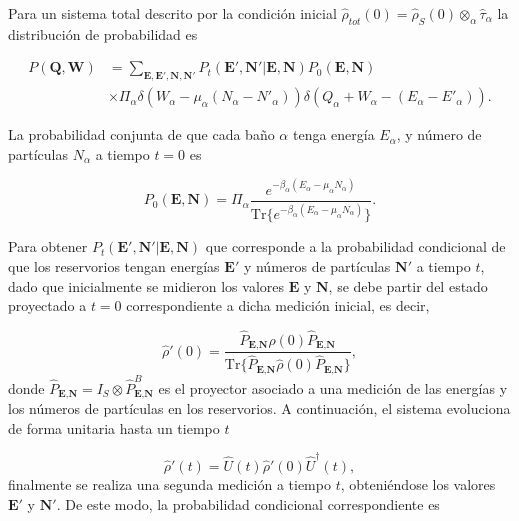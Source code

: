 Para  un sistema total descrito por la condición inicial $\hat{\rho}_{tot}(0) = \hat{\rho}_{S}(0) \otimes_{\alpha} \hat{\tau}_{\alpha}$ la distribución de probabilidad es   

\begin{align*}
    P(\textbf{Q},\textbf{W}) & = \sum_{\textbf{E},\textbf{E}',\textbf{N},\textbf{N}'} P_{t}(\textbf{E}',\textbf{N}'|\textbf{E},\textbf{N}) P_{0}(\textbf{E},\textbf{N})\\
                             & \times \Pi_{\alpha} \delta(W_{\alpha} - \mu_{\alpha}(N_{\alpha} - N'_{\alpha})) \delta(Q_{\alpha} + W_{\alpha}  - (E_{\alpha} - E'_{\alpha})).   
\end{align*}

La probabilidad conjunta de que cada baño $\alpha$ tenga energía $E_{\alpha}$, y número de partículas $N_{\alpha}$ a tiempo $t=0$ es

\begin{equation*}
    P_{0}(\textbf{E},\textbf{N}) = \Pi_{\alpha}  \frac{e^{-\beta_{\alpha}(E_{\alpha} - \mu_{\alpha}N_{\alpha} )  }}{ \text{Tr}\{e^{-\beta_{\alpha}(E_{\alpha} - \mu_{\alpha}N_{\alpha} )  }\} }.
\end{equation*}

Para obtener $P_{t}(\textbf{E}',\textbf{N}'|\textbf{E},\textbf{N})$ que corresponde a la probabilidad condicional de que los reservorios tengan energías $\textbf{E}'$ y números de partículas $\textbf{N}'$ a tiempo $t$, dado que inicialmente se midieron los valores $\textbf{E}$ y $\textbf{N}$, se debe partir del estado proyectado a $t=0$ correspondiente a dicha medición inicial, es decir,

\begin{equation*}
    \hat{\rho}'(0) = \frac{\hat{P}_{\textbf{E}, \textbf{N} }\hat{\rho}(0) \hat{P}_{\textbf{E}, \textbf{N} } }{\text{Tr}\{\hat{P}_{\textbf{E}, \textbf{N} }\hat{\rho}(0) \hat{P}_{\textbf{E}, \textbf{N} } \} },
\end{equation*}
donde $\hat{P}_{\textbf{E}, \textbf{N} } = I_{S} \otimes \hat{P}^{B}_{\textbf{E}, \textbf{N} }$ es el proyector asociado a una medición de las energías y los números de partículas en los reservorios. A continuación, el sistema evoluciona de forma unitaria hasta un tiempo $t$

\begin{equation*}
    \hat{\rho}'(t) = \hat{U}(t)\hat{\rho}'(0)\hat{U}^{\dagger}(t),
\end{equation*}
finalmente se realiza una segunda medición a tiempo $t$, obteniéndose los valores $\textbf{E}'$ y $\textbf{N}'$. De este modo, la probabilidad condicional correspondiente es

